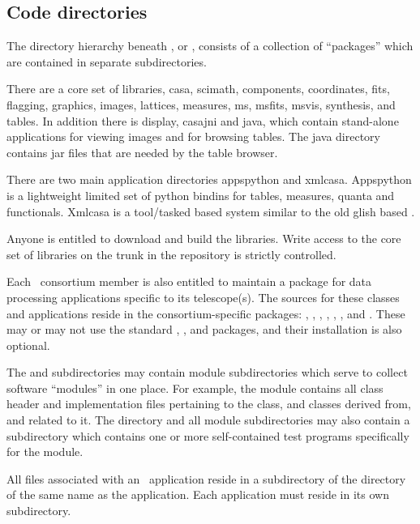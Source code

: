 \subsection{Code directories}
\label{Code directories}

The directory hierarchy beneath , or ,
consists of a collection of ``packages'' which are contained in separate
subdirectories.

There are a core set of \casa libraries, casa, scimath, components, coordinates, fits, flagging,
graphics, images, lattices, measures, ms, msfits, msvis, synthesis, and tables. In addition there
is display, casajni and java, which contain stand-alone applications for viewing images and for
browsing tables. The java directory contains jar files that are needed by the table browser.

There are two main application directories appspython and xmlcasa. Appspython is a lightweight limited
set of python bindins for tables, measures, quanta and functionals. Xmlcasa is a tool/tasked based system
similar to the old glish based \casa.

Anyone is entitled to download and build the \casa libraries. Write access to the core set of
libraries on the trunk in the repository is strictly controlled.

Each \casa\ consortium member is also entitled to maintain a package for
data processing applications specific to its telescope(s).  The sources for
these classes and applications reside in the consortium-specific packages:
, , , , , ,
and .  These may or may not use the standard ,
, and  packages, and their installation is also
optional.

The  and  subdirectories may contain module
subdirectories which serve to collect software ``modules'' in one place.  For
example, the  module contains all class header and implementation
files pertaining to the  class, and classes derived from, and
related to it.  The  directory and all module subdirectories
may also contain a  subdirectory which contains one or more
self-contained test programs specifically for the module.

All files associated with an \casa\ application reside in a subdirectory of
the  directory of the same name as the application.  Each
application must reside in its own subdirectory.

